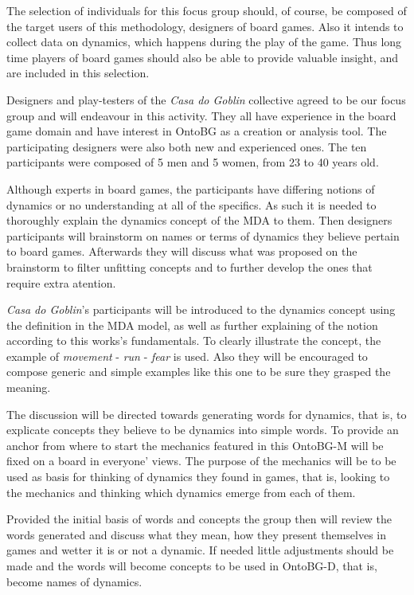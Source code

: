 The selection of individuals for this focus group should, of course, be composed of the target users of this methodology, designers of board games. Also it intends to collect data on dynamics, which happens during the play of the game. Thus long time players of board games should also be able to provide valuable insight, and are included in this selection. 

Designers and play-testers of the \textit{Casa do Goblin} collective agreed to be our focus group and will endeavour in this activity. They all have experience in the board game domain and have interest in OntoBG as a creation or analysis tool. The participating designers were also both new and experienced ones. The ten participants were composed of 5 men and 5 women, from 23 to 40 years old.

Although experts in board games, the participants have differing notions of dynamics or no understanding at all of the specifics. As such it is needed to thoroughly explain the dynamics concept of the MDA to them. Then designers participants will brainstorm on names or terms of dynamics they believe pertain to board games. Afterwards they will discuss what was proposed on the brainstorm to filter unfitting concepts and to further develop the ones that require extra atention.

\textit{Casa do Goblin}'s participants will be introduced to the dynamics concept using the definition in the MDA model, as well as further explaining of the notion according to this works's fundamentals. To clearly illustrate the concept, the example of \textit{movement} - \textit{run} - \textit{fear}  is used. Also they will be encouraged to compose generic and simple examples like this one to be sure they grasped the meaning. 

The discussion will be directed towards generating words for dynamics, that is, to explicate concepts they believe to be dynamics into simple words. To provide an anchor from where to start the mechanics featured in this OntoBG-M will be fixed on a board in everyone' views. The purpose of the mechanics will be to be used as basis for thinking of dynamics they found in games, that is, looking to the mechanics and thinking which dynamics emerge from each of them.

Provided the initial basis of words and concepts the group then will review the words generated and discuss what they mean, how they present themselves in games and wetter it is or not a dynamic. If needed little adjustments should be made and the words will become concepts to be used in OntoBG-D, that is, become names of dynamics.

